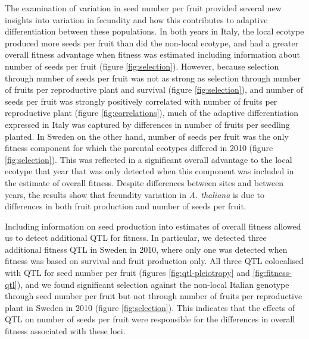 \documentclass[]{article}
\begin{document}
The examination of variation in seed number per fruit provided several new insights into variation in fecundity and how this contributes to adaptive differentiation between these populations.
In both years in Italy, the local ecotype produced more seeds per fruit than did the non-local ecotype, and had a greater overall fitness advantage when fitness was estimated including information about number of seeds per fruit (figure \ref{fig:selection}).
However, because selection through number of seeds per fruit was not as strong as selection through number of fruits per reproductive plant and survival (figure \ref{fig:selection}), and number of seeds per fruit was strongly positively correlated with number of fruits per reproductive plant (figure \ref{fig:correlations}), much of the adaptive differentiation expressed in Italy was captured by differences in number of fruits per seedling planted.
In Sweden on the other hand, number of seeds per fruit was the only fitness component for which the parental ecotypes differed in 2010 (figure \ref{fig:selection}).
This was reflected in a significant overall advantage to the local ecotype that year that was only detected when this component was included in the estimate of overall fitness.
Despite differences between sites and between years, the results show that fecundity variation in \emph{A. thaliana} is due to differences in both fruit production and number of seeds per fruit.

Including information on seed production into estimates of overall fitness allowed us to detect additional QTL for fitness. In particular, we detected three additional fitness QTL in Sweden in 2010, where only one was detected when fitness was based on survival and fruit production only. All three QTL colocalised with QTL for seed number per fruit (figures \ref{fig:qtl-pleiotropy} and \ref{fig:fitness-qtl}), and we found significant selection against the non-local Italian genotype through seed number per fruit but not through number of fruits per reproductive plant in Sweden in 2010 (figure \ref{fig:selection}). This indicates that the effects of QTL on number of seeds per fruit were responsible for the differences in overall fitness associated with these loci.
\end{document}
